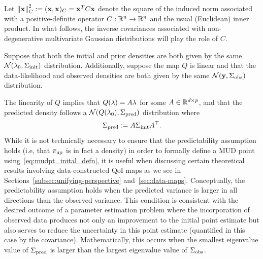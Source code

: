 

Let $\left\Vert\mathbf{x}\right\Vert_C^2 := (\mathbf{x}, \mathbf{x})_C = \mathbf{x}^T C \mathbf{x} $ denote the square of the induced norm associated with a positive-definite operator $C : \mathbb{R}^n \to \mathbb{R}^n$ and the usual (Euclidean) inner product.
In what follows, the inverse covariances associated with non-degenerative multivariate Gaussian distributions will play the role of $C$.
%

Suppose that both the initial and prior densities are both given by the same $\mathcal{N}(\lambda_0, \Sigma_\text{init})$ distribution.
Additionally, suppose the map $Q$ is linear and that the data-likelihood and observed densities are both given by the same $\mathcal{N}(\mathbf{y}, \Sigma_\text{obs})$ distribution.

The linearity of $Q$ implies that $Q(\lambda)=A\lambda$ for some $A\in\mathbb{R}^{d\times p}$, and that the predicted density follows a $\mathcal{N}(Q(\lambda_0), \Sigma_\text{pred})$ distribution where
\begin{equation}\label{eq:predictCov}
	\Sigma_\text{pred} := A\Sigma_\text{init} A^\top.
\end{equation}
While it is not technically necessary to ensure that the predictability assumption holds (i.e, that $\operatorname*{\pi_{up}}$ is in fact a density) in order to formally define a MUD point using~\eqref{eq:mudpt_inital_defn}, it is useful when discussing certain theoretical results involving data-constructed QoI maps as we see in Sections~\ref{subsec:unifying-perspective} and~\ref{sec:data-maps}.
Conceptually, the predictability assumption holds when the predicted variance is larger in all directions than the observed variance.
This condition is consistent with the desired outcome of a parameter estimation problem where the incorporation of observed data produces not only an improvement to the initial point estimate but also serves to reduce the uncertainty in this point estimate (quantified in this case by the covariance).
Mathematically, this occurs when the smallest eigenvalue value of $\Sigma_\text{pred}$ is larger than the largest eigenvalue value of $\Sigma_\text{obs}$.

